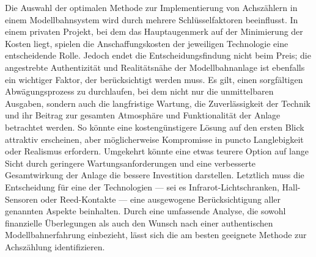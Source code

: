 Die Auswahl der optimalen Methode zur Implementierung von Achszählern in einem Modellbahnsystem wird durch mehrere Schlüsselfaktoren beeinflusst. In einem privaten Projekt, bei dem das Hauptaugenmerk auf der Minimierung der Kosten liegt, spielen die Anschaffungskosten der jeweiligen Technologie eine entscheidende Rolle. Jedoch endet die Entscheidungsfindung nicht beim Preis; die angestrebte Authentizität und Realitätsnähe der Modellbahnanlage ist ebenfalls ein wichtiger Faktor, der berücksichtigt werden muss.
\newline
Es gilt, einen sorgfältigen Abwägungsprozess zu durchlaufen, bei dem nicht nur die unmittelbaren Ausgaben, sondern auch die langfristige Wartung, die Zuverlässigkeit der Technik und ihr Beitrag zur gesamten Atmosphäre und Funktionalität der Anlage betrachtet werden. So könnte eine kostengünstigere Lösung auf den ersten Blick attraktiv erscheinen, aber möglicherweise Kompromisse in puncto Langlebigkeit oder Realismus erfordern. Umgekehrt könnte eine etwas teurere Option auf lange Sicht durch geringere Wartungsanforderungen und eine verbesserte Gesamtwirkung der Anlage die bessere Investition darstellen.
\newline
Letztlich muss die Entscheidung für eine der Technologien --- sei es Infrarot-Lichtschranken, Hall-Sensoren oder Reed-Kontakte --- eine ausgewogene Berücksichtigung aller genannten Aspekte beinhalten. Durch eine umfassende Analyse, die sowohl finanzielle Überlegungen als auch den Wunsch nach einer authentischen Modellbahnerfahrung einbezieht, lässt sich die am besten geeignete Methode zur Achszählung identifizieren.
